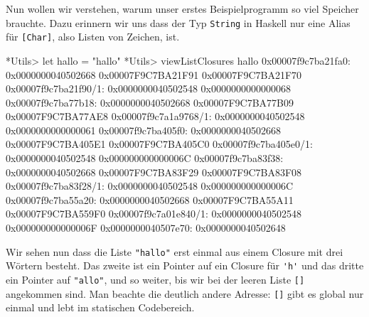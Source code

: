\documentclass[11pt,DIV=12,parskip=half,headings=normal,abstract]{scrartcl}
\newcommand{\li}{\lstinline[style=haskell]}
\begin{document}
Nun wollen wir verstehen, warum unser erstes Beispielprogramm so viel Speicher brauchte. Dazu erinnern wir uns dass der Typ \li-String- in Haskell nur eine Alias für \li-[Char]-, also Listen von Zeichen, ist.
\begin{ghci}
*Utils> let hallo = "hallo"
*Utils> viewListClosures hallo
0x00007f9c7ba21fa0: 0x0000000040502668 0x00007F9C7BA21F91 0x00007F9C7BA21F70
0x00007f9c7ba21f90/1: 0x0000000040502548 0x0000000000000068
0x00007f9c7ba77b18: 0x0000000040502668 0x00007F9C7BA77B09 0x00007F9C7BA77AE8
0x00007f9c7a1a9768/1: 0x0000000040502548 0x0000000000000061
0x00007f9c7ba405f0: 0x0000000040502668 0x00007F9C7BA405E1 0x00007F9C7BA405C0
0x00007f9c7ba405e0/1: 0x0000000040502548 0x000000000000006C
0x00007f9c7ba83f38: 0x0000000040502668 0x00007F9C7BA83F29 0x00007F9C7BA83F08
0x00007f9c7ba83f28/1: 0x0000000040502548 0x000000000000006C
0x00007f9c7ba55a20: 0x0000000040502668 0x00007F9C7BA55A11 0x00007F9C7BA559F0
0x00007f9c7a01e840/1: 0x0000000040502548 0x000000000000006F
0x0000000040507e70: 0x0000000040502648
\end{ghci}
Wir sehen nun dass die Liste \li-"hallo"- erst einmal aus einem Closure mit drei Wörtern besteht. Das zweite ist ein Pointer auf ein Closure für \li-'h'- und das dritte ein Pointer auf \li-"allo"-, und so weiter, bis wir bei der leeren Liste \li-[]- angekommen sind. Man beachte die deutlich andere Adresse: \li-[]- gibt es global nur einmal und lebt im statischen Codebereich.
\end{document}
